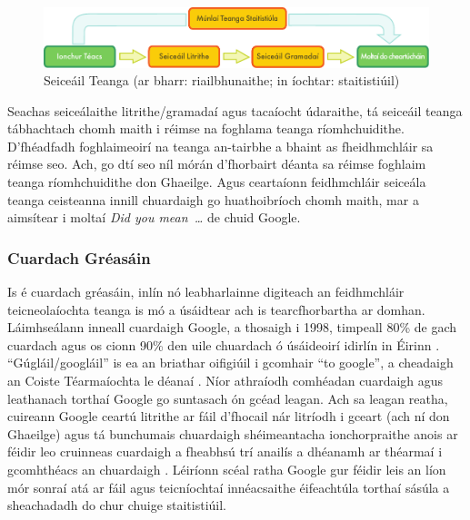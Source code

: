 \begin{multicols}{2}
\begin{figure}[htb]
  \center
  \includegraphics[width=\textwidth]{../_media/irish/language_checking}
  \caption{Seiceáil Teanga (ar bharr: riailbhunaithe; in íochtar: staitistiúil)}
  \label{fig:langcheckingaarch_de}
\end{figure}


Seachas seiceálaithe litrithe/gramadaí agus tacaíocht údaraithe, tá seiceáil teanga tábhachtach chomh maith i réimse na foghlama teanga ríomhchuidithe. D’fhéadfadh foghlaimeoirí na teanga an-tairbhe a bhaint as fheidhmchláir sa réimse seo. Ach, go dtí seo níl mórán d’fhorbairt déanta sa réimse foghlaim teanga ríomhchuidithe don Ghaeilge. Agus ceartaíonn feidhmchláir seiceála teanga ceisteanna innill chuardaigh go huathoibríoch chomh maith, mar a aimsítear i moltaí \textit{Did you mean~\dots} de chuid Google.

\subsubsection{Cuardach Gréasáin}

Is é cuardach gréasáin, inlín nó leabharlainne digiteach an feidhmchláir teicneolaíochta teanga is mó a úsáidtear ach is tearcfhorbartha ar domhan. Láimhseálann inneall cuardaigh Google, a thosaigh i 1998, timpeall 80\% de gach cuardach agus os cionn 90\% den uile chuardach ó úsáideoirí idirlín in Éirinn \cite{googlemarketshare}.  ``Gúgláil/googláil'' is ea an briathar oifigiúil i gcomhair ``to google'', a cheadaigh an Coiste Téarmaíochta le déanaí \cite{kilgarriff2010}.  Níor athraíodh comhéadan cuardaigh agus leathanach torthaí Google go suntasach ón gcéad leagan. Ach sa leagan reatha, cuireann Google ceartú litrithe ar fáil d’fhocail nár litríodh i gceart (ach ní don Ghaeilge) agus tá bunchumais chuardaigh shéimeantacha ionchorpraithe anois ar féidir leo cruinneas cuardaigh a fheabhsú trí anailís a dhéanamh ar théarmaí i gcomhthéacs an chuardaigh \cite{googlesemsearch}. Léiríonn scéal ratha Google gur féidir leis an líon mór sonraí atá ar fáil agus teicníochtaí innéacsaithe éifeachtúla torthaí sásúla a sheachadadh do chur chuige staitistiúil. 


\end{multicols}
